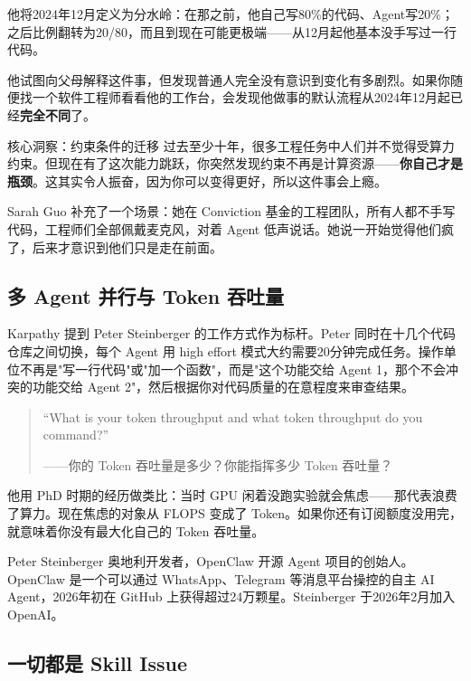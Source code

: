 \documentclass[a4paper]{article}
\begin{document}
他将2024年12月定义为分水岭：在那之前，他自己写80\%的代码、Agent写20\%；之后比例翻转为20/80，而且到现在可能更极端——从12月起他基本没手写过一行代码。

他试图向父母解释这件事，但发现普通人完全没有意识到变化有多剧烈。如果你随便找一个软件工程师看看他的工作台，会发现他做事的默认流程从2024年12月起已经\textbf{完全不同}了。

\begin{importantbox}{核心洞察：约束条件的迁移}
过去至少十年，很多工程任务中人们并不觉得受算力约束。但现在有了这次能力跳跃，你突然发现约束不再是计算资源——\textbf{你自己才是瓶颈}。这其实令人振奋，因为你可以变得更好，所以这件事会上瘾。
\end{importantbox}

Sarah Guo 补充了一个场景：她在 Conviction 基金的工程团队，所有人都不手写代码，工程师们全部佩戴麦克风，对着 Agent 低声说话。她说一开始觉得他们疯了，后来才意识到他们只是走在前面。

\subsection{多 Agent 并行与 Token 吞吐量}

Karpathy 提到 Peter Steinberger 的工作方式作为标杆。Peter 同时在十几个代码仓库之间切换，每个 Agent 用 high effort 模式大约需要20分钟完成任务。操作单位不再是"写一行代码"或"加一个函数"，而是"这个功能交给 Agent 1，那个不会冲突的功能交给 Agent 2"，然后根据你对代码质量的在意程度来审查结果。

\begin{quote}
``What is your token throughput and what token throughput do you command?''

——你的 Token 吞吐量是多少？你能指挥多少 Token 吞吐量？
\end{quote}

他用 PhD 时期的经历做类比：当时 GPU 闲着没跑实验就会焦虑——那代表浪费了算力。现在焦虑的对象从 FLOPS 变成了 Token。如果你还有订阅额度没用完，就意味着你没有最大化自己的 Token 吞吐量。

\begin{knowledgebox}{Peter Steinberger}
奥地利开发者，OpenClaw 开源 Agent 项目的创始人。OpenClaw 是一个可以通过 WhatsApp、Telegram 等消息平台操控的自主 AI Agent，2026年初在 GitHub 上获得超过24万颗星。Steinberger 于2026年2月加入 OpenAI。
\end{knowledgebox}

\subsection{一切都是 Skill Issue}
\end{document}
